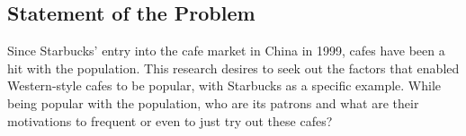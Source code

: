 

\subsection{Statement of the Problem}

Since Starbucks' entry into the cafe market in China in 1999, cafes have been a
hit with the population. This research desires to seek out the factors that
enabled Western-style cafes to be popular, with Starbucks as a specific example.
While being popular with the population, who are its patrons and what are their
motivations to frequent or even to just try out these cafes? 







\begin{comment}
\begin{itemize}
	\item Habitus as a framework
	\item Drinker demographics
	\item How did international franchises adapt
	\item How did the coffee culture start
\end{itemize}
\end{comment}


